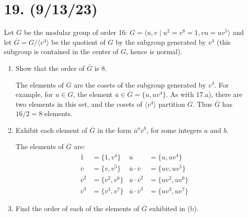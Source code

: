 \documentclass{article}
\begin{document}
\section*{19. (9/13/23)}

Let $G$ be the modular group of order 16: $G = \langle u, v \mid u^2 = v^8 = 1, vu = uv^5 \rangle$ and let $\overline{G} = G/\langle v^4 \rangle$ be the quotient of $G$ by the subgroup generated by $v^4$ (this subgroup is contained in the center of $G$, hence is normal). 

\begin{enumerate}[label=(\alph*), itemsep=0em]
    \item Show that the order of $\overline{G}$ is 8.
    
          The elements of $\overline{G}$ are the cosets of the subgroup generated by $v^4$. For example, for $u \in G$, the element $\overline{u} \in \overline{G} = \{ u, u v^4 \}$. As with 17.a), there are two elements in this set, and the cosets of $\langle v^4 \rangle$ partition $G$. Thus $\overline{G}$ has $16/2 = 8$ elements.
    \item Exhibit each element of $\overline{G}$ in the form $\overline{u}^a \overline{v}^b$, for some integers $a$ and $b$.

          The elements of $\overline{G}$ are:
          \begin{align*}
            \overline{1} &= \{ 1, v^4 \} & \overline{u} &= \{ u, uv^4 \} \\ 
            \overline{v} &= \{ v, v^5 \} & \overline{u}\cdot\overline{v} &= \{ uv, uv^5 \} \\
            \overline{v}^2 &= \{ v^2, v^6 \} & \overline{u}\cdot\overline{v}^2 &= \{ uv^2, uv^6 \} \\
            \overline{v}^3 &= \{ v^3, v^7 \} & \overline{u}\cdot\overline{v}^3 &= \{ uv^3, uv^7 \}
          \end{align*}
    \item Find the order of each of the elements of $\overline{G}$ exhibited in (b).


\end{enumerate}
\end{document}
